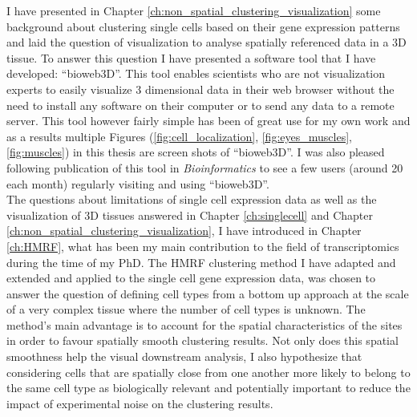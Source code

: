 I have presented in Chapter \ref{ch:non_spatial_clustering_visualization} some background about clustering single cells based on their gene expression patterns and laid the question of visualization to analyse spatially referenced data in a 3D tissue. To answer this question I have presented a software tool that I have developed: ``bioweb3D''. This tool enables scientists who are not visualization experts to easily visualize 3 dimensional data in their web browser without the need to install any software on their computer or to send any data to a remote server. This tool however fairly simple has been of great use for my own work and as a results multiple Figures (\ref{fig:cell_localization}, \ref{fig:eyes_muscles}, \ref{fig:muscles}) in this thesis are screen shots of ``bioweb3D''. I was also pleased following publication of this tool in \emph{Bioinformatics} \cite{Pettit13} to see a few users (around 20 each month) regularly visiting and using ``bioweb3D''.\\

The questions about limitations of single cell expression data as well as the visualization of 3D tissues answered in Chapter \ref{ch:singlecell} and Chapter \ref{ch:non_spatial_clustering_visualization}, I have introduced in Chapter \ref{ch:HMRF}, what has been my main contribution to the field of transcriptomics during the time of my PhD. The HMRF clustering method I have adapted and extended and applied to the single cell gene expression data, was chosen to answer the question of defining cell types from a bottom up approach at the scale of a very complex tissue where the number of cell types is unknown. The method's main advantage is to account for the spatial characteristics of the sites in order to favour spatially smooth clustering results. Not only does this spatial smoothness help the visual downstream analysis, I also hypothesize that considering cells that are spatially close from one another more likely to belong to the same cell type as biologically relevant and potentially important to reduce the impact of experimental noise on the clustering results.\\

